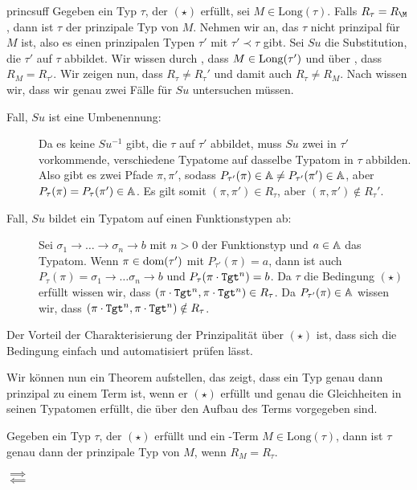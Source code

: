 \begin{lemma}{}{princsuff}
Gegeben ein Typ $\tau$, der $(\star)$ erfüllt, sei $M\in\text{Long}(\tau)$. Falls $R_\tau = R_\M$, dann ist $\tau$ der prinzipale Typ von $M$.
\Proof
Nehmen wir an, das $\tau$ nicht prinzipal für $M$ ist, also es einen prinzipalen Typen $\tau'$ mit $\tau'\prec \tau$ gibt. Sei $Su$ die Substitution, die $\tau'$ auf $\tau$ abbildet. Wir wissen durch , dass $M\in\text{Long}(\tau')$ und über , dass $R_M = R_{\tau'}$. Wir zeigen nun, dass $R_\tau \neq R_\tau'$ und damit auch $R_\tau\neq R_M$. Nach  wissen wir, dass wir genau zwei Fälle für $Su$ untersuchen müssen.
\begin{description}
    \item[Fall, $Su$ ist eine Umbenennung:] Da es keine $Su^{-1}$ gibt, die $\tau$ auf $\tau'$ abbildet, muss $Su$ zwei in $\tau'$ vorkommende, verschiedene Typatome auf dasselbe Typatom in $\tau$ abbilden. Also gibt es zwei Pfade $\pi,\pi'$, sodass $P_{\tau'}(\pi)\in\mathbb{A}\neq P_{\tau'}(\pi')\in\mathbb{A}$, aber $P_\tau(\pi) = P_\tau(\pi')\in\mathbb{A}$. Es gilt somit $(\pi,\pi')\in R_\tau$, aber $(\pi,\pi')\notin R_\tau'.$
    \item[Fall, $Su$ bildet ein Typatom auf einen Funktionstypen ab:] Sei $\sigma_1\to\ldots\to\sigma_n\to b$ mit $n > 0$ der Funktionstyp und $a\in\mathbb{A}$ das Typatom. Wenn $\pi\in\text{dom}(\tau')$ mit $P_{\tau'}(\pi) = a$, dann ist auch $P_{\tau}(\pi) = \sigma_1\to\ldots\sigma_n\to b$ und $P_\tau(\pi\cdot\texttt{Tgt}^n) = b$.
    Da $\tau$ die Bedingung $(\star)$ erfüllt wissen wir, dass $(\pi\cdot\texttt{Tgt}^n,\pi\cdot\texttt{Tgt}^n)\in R_{\tau}$. Da $P_{\tau'}(\pi) \in\mathbb{A}$ wissen wir, dass $(\pi\cdot\texttt{Tgt}^n, \pi\cdot\texttt{Tgt}^n)\notin R_\tau$.
\end{description}
\end{lemma}

Der Vorteil der Charakterisierung der Prinzipalität über $(\star)$ ist, dass sich die Bedingung einfach und automatisiert prüfen lässt. 

Wir können nun ein Theorem aufstellen, das zeigt, dass ein Typ genau dann prinzipal zu einem Term ist, wenn er $(\star)$ erfüllt und genau die Gleichheiten in seinen Typatomen erfüllt, die über den Aufbau des Terms vorgegeben sind.

\begin{theorem}{}{}
    Gegeben ein Typ $\tau$, der $(\star)$ erfüllt und ein \tlambda-Term $M\in\text{Long}(\tau)$, dann ist $\tau$ genau dann der prinzipale Typ von $M$, wenn $R_M = R_\tau$.
    \Proof    
    \begin{description}
        \item[$\implies$] 
        \item[$\impliedby$] 
    \end{description}
\end{theorem}    